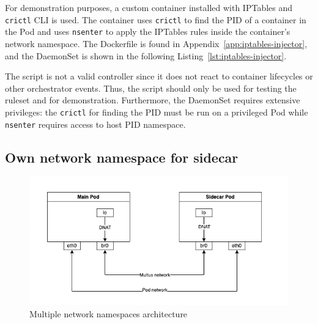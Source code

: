 \documentclass[english, 12pt, a4paper, sci, utf8, a-2b, online]{aaltothesis}
\begin{document}
For demonstration purposes, a custom container installed with IPTables and \texttt{crictl} CLI is used.
The container uses \texttt{crictl} to find the PID of a container in the Pod and uses \texttt{nsenter} to apply the IPTables rules inside the container's network namespace.
The Dockerfile is found in Appendix~\ref{app:iptables-injector}, and the DaemonSet is shown in the following Listing~\ref{lst:iptables-injector}.



The script is not a valid controller since it does not react to container lifecycles or other orchestrator events.
Thus, the script should only be used for testing the ruleset and for demonstration.
Furthermore, the DaemonSet requires extensive privileges: the \texttt{crictl} for finding the PID must be run on a privileged Pod while \texttt{nsenter} requires access to host PID namespace.

\subsection{Own network namespace for sidecar}





\begin{figure}[h!]
  \centering
  \includegraphics[width=\linewidth]{files/multus.png}
  \caption{Multiple network namespaces architecture}
  \label{fig:multi-pod-net-solution}
\end{figure}
\end{document}
